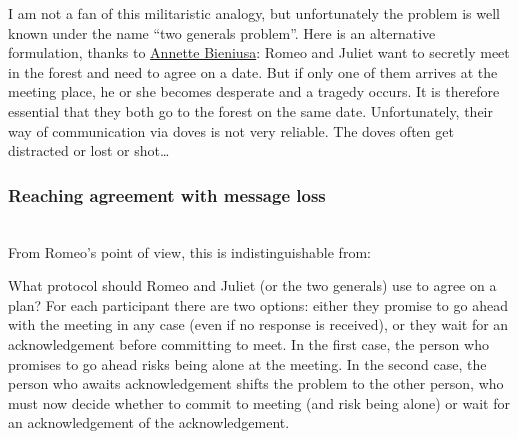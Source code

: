 I am not a fan of this militaristic analogy, but unfortunately the problem is well known under the name ``two generals problem''.
Here is an alternative formulation, thanks to \href{https://twitter.com/anne_biene/status/1386975750671187970}{Annette Bieniusa}:
Romeo and Juliet want to secretly meet in the forest and need to agree on a date.
But if only one of them arrives at the meeting place, he or she becomes desperate and a tragedy occurs.
It is therefore essential that they both go to the forest on the same date.
Unfortunately, their way of communication via doves is not very reliable.
The doves often get distracted or lost or shot\dots

\begin{frame}
    \label{s:two-generals-comms}
    \frametitle{Reaching agreement with message loss}
    \begin{center}
        \pause\\[1em]
        From Romeo's point of view, this is indistinguishable from:\\[1em]
    \end{center}
\end{frame}

What protocol should Romeo and Juliet (or the two generals) use to agree on a plan?
For each participant there are two options: either they promise to go ahead with the meeting in any case (even if no response is received), or they wait for an acknowledgement before committing to meet.
In the first case, the person who promises to go ahead risks being alone at the meeting.
In the second case, the person who awaits acknowledgement shifts the problem to the other person, who must now decide whether to commit to meeting (and risk being alone) or wait for an acknowledgement of the acknowledgement.

